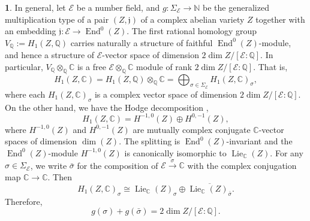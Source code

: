 \documentclass{amsart}[11pt]
\theoremstyle{definition}
\newtheorem{sect}[thm]{}
\numberwithin{equation}{section}
\theoremstyle{notitle}
\begin{document}
\begin{sect}\label{subsec:Hodge-decomposition}
  In general, let ${\mathcal{E}}$ be a number field, and $g: \Sigma_{\mathcal{E}}\to {\mathbb{N}}$
  be the generalized multiplication type of a pair $(Z, {\mathfrak{j}})$ of a
  complex abelian variety $Z$ together with an embedding ${\mathfrak{j}}:
  {\mathcal{E}}\to \operatorname{End}^0(Z)$.  The first rational homology group
  $V_{\mathbb{Q}}:=H_1(Z,{\mathbb{Q}})$ carries naturally a structure of faithful
  $\operatorname{End}^0(Z)$-module, and hence a structure of ${\mathcal{E}}$-vector space of
  dimension $2\dim Z/[{\mathcal{E}}:{\mathbb{Q}}]$. In particular, $V_{\mathbb{Q}}\otimes_{\mathbb{Q}}{\mathbb{C}}$
  is a free ${\mathcal{E}}\otimes_{\mathbb{Q}} {\mathbb{C}}$ module of rank $2\dim Z/[{\mathcal{E}}:{\mathbb{Q}}]$. That
  is,
  \[ H_1(Z, {\mathbb{C}})=H_1(Z,{\mathbb{Q}})\otimes_{\mathbb{Q}}{\mathbb{C}} = \bigoplus_{\sigma\in
    \Sigma_{\mathcal{E}}} H_1(Z, {\mathbb{C}})_\sigma, \] where each $H_1(Z, {\mathbb{C}})_\sigma$
  is a complex vector space of dimension $2\dim Z/[{\mathcal{E}}:{\mathbb{Q}}]$.  On the
  other hand, we have the Hodge decomposition \cite[Chapter
  1]{Mumford_AV},
  \[ H_1(Z, {\mathbb{C}})= H^{-1,0}(Z)\oplus H^{0, -1}(Z),\] where
  $H^{-1,0}(Z)$ and $H^{0, -1}(Z)$ are mutually complex conjugate
  ${\mathbb{C}}$-vector spaces of dimension $\dim(Z)$. The splitting is
  $\operatorname{End}^0(Z)$-invariant and the $\operatorname{End}^0(Z)$-module $H^{-1,0}(Z)$ is
  canonically isomorphic to $\operatorname{Lie}_{\mathbb{C}}(Z)$. For any $\sigma\in
  \Sigma_{\mathcal{E}}$, we write $\bar{\sigma}$ for the composition of
  ${\mathcal{E}}\xrightarrow{\sigma} {\mathbb{C}}$ with the complex conjugation map
  ${\mathbb{C}}\to {\mathbb{C}}$. Then
\[ H_1(Z, {\mathbb{C}})_\sigma\cong  \operatorname{Lie}_{\mathbb{C}}(Z)_\sigma \oplus \overline{\operatorname{Lie}_{\mathbb{C}}(Z)_{\bar{\sigma}}}.\]
Therefore,
\begin{equation}
  \label{eq:hodge-decomposition}
  g(\sigma)+g(\bar{\sigma})= 2\dim Z/[{\mathcal{E}}:{\mathbb{Q}}].
\end{equation}
\end{sect}
\end{document}
